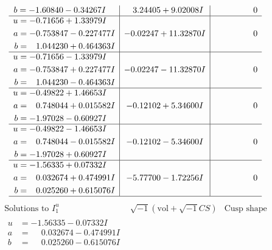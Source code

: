\documentclass[1p]{elsarticle_modified}
\theoremstyle{definition}
\newcommand{\I}{\sqrt{-1}}
\begin{document}
$$\begin{array}{c|c|c}
\begin{aligned}
b &= -1.60840 - 0.34267 I\end{aligned}
 & \phantom{-}3.24405 + 9.02008 I & \phantom{-0.000000 } 0 \\ \hline\begin{aligned}
u &= -0.71656 + 1.33979 I \\
a &= -0.753847 - 0.227477 I \\
b &= \phantom{-}1.044230 + 0.464363 I\end{aligned}
 & -0.02247 + 11.32870 I & \phantom{-0.000000 } 0 \\ \hline\begin{aligned}
u &= -0.71656 - 1.33979 I \\
a &= -0.753847 + 0.227477 I \\
b &= \phantom{-}1.044230 - 0.464363 I\end{aligned}
 & -0.02247 - 11.32870 I & \phantom{-0.000000 } 0 \\ \hline\begin{aligned}
u &= -0.49822 + 1.46653 I \\
a &= \phantom{-}0.748044 + 0.015582 I \\
b &= -1.97028 - 0.60927 I\end{aligned}
 & -0.12102 + 5.34600 I & \phantom{-0.000000 } 0 \\ \hline\begin{aligned}
u &= -0.49822 - 1.46653 I \\
a &= \phantom{-}0.748044 - 0.015582 I \\
b &= -1.97028 + 0.60927 I\end{aligned}
 & -0.12102 - 5.34600 I & \phantom{-0.000000 } 0 \\ \hline\begin{aligned}
u &= -1.56335 + 0.07332 I \\
a &= \phantom{-}0.032674 + 0.474991 I \\
b &= \phantom{-}0.025260 + 0.615076 I\end{aligned}
 & -5.77700 - 1.72256 I & \phantom{-0.000000 } 0\\
 \hline 
 \end{array}$$\newpage$$\begin{array}{c|c|c}  
\text{Solutions to }I^u_{1}& \I (\text{vol} + \sqrt{-1}CS) & \text{Cusp shape}\\
 \hline 
\begin{aligned}
u &= -1.56335 - 0.07332 I \\
a &= \phantom{-}0.032674 - 0.474991 I \\
b &= \phantom{-}0.025260 - 0.615076 I\end{aligned}

\end{array}$$
\end{document}
